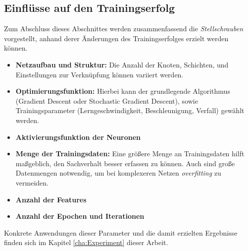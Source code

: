 \subsection{Einflüsse auf den Trainingserfolg}
Zum Abschluss dieses Abschnittes werden zusammenfassend die \textit{Stellschrauben} vorgestellt, anhand derer Änderungen des Trainingserfolges erzielt werden können. 

\begin{itemize}
	\item \textbf{Netzaufbau und Struktur:} Die Anzahl der Knoten, Schichten, und Einstellungen zur Verknüpfung können variiert werden.
	\item \textbf{Optimierungsfunktion:} Hierbei kann der grundlegende Algorithmus (Gradient Descent oder Stochastic Gradient Descent), sowie Trainingsparameter (Lerngeschwindigkeit, Beschleunigung, Verfall) gewählt werden.
	\item \textbf{Aktivierungsfunktion der Neuronen}
	\item \textbf{Menge der Trainingsdaten:} Eine größere Menge an Trainingsdaten hilft maßgeblich, den Sachverhalt besser erfassen zu können. Auch sind große Datenmengen notwendig, um bei komplexeren Netzen \textit{overfitting} zu vermeiden.
	\item \textbf{Anzahl der Features} 
	\item \textbf{Anzahl der Epochen und Iterationen}
	
\end{itemize}

Konkrete Anwendungen dieser Parameter und die damit erzielten Ergebnisse finden sich im Kapitel \ref{cha:Experiment} dieser Arbeit.